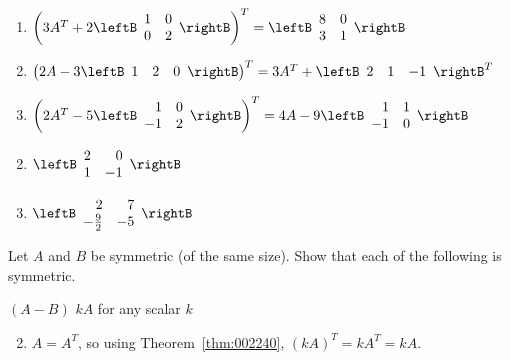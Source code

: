 \begin{multicols}{2}
\begin{ex}
\begin{enumerate}[label={\alph*.}]
\item 
$\left(3A^{T} + 2 \leftB \begin{array}{rr}
1 & 0 \\
0 & 2
\end{array} \rightB \right)^{T} = \leftB \begin{array}{rr}
8 & 0 \\
3 & 1
\end{array} \rightB$

\item 
$\left(2A - 3 \leftB \begin{array}{rrr}
1 & 2 & 0
\end{array} \rightB \right)^{T} = 3A^{T} + \leftB \begin{array}{rrr}
2 & 1 & -1
\end{array} \rightB^{T}$ 

\item 
$\left(2A^{T} - 5 \leftB \begin{array}{rr}
1 & 0 \\
-1 & 2
\end{array} \rightB \right)^{T} = 4A - 9 \leftB \begin{array}{rr}
1 & 1 \\
-1 & 0
\end{array} \rightB$

\end{enumerate}
\begin{sol}
\begin{enumerate}[label={\alph*.}]
\setcounter{enumi}{1}
\item  
$\leftB \begin{array}{rr}
2 & 0 \\
1 & -1
\end{array} \rightB$

\setcounter{enumi}{3}
\item  
$\leftB \begin{array}{rr}
2 & 7 \\
-\frac{9}{2} & -5
\end{array} \rightB$


\end{enumerate}
\end{sol}
\end{ex}

\begin{ex}
Let $A$ and $B$ be symmetric (of the same size). Show that each of the following is symmetric.
\begin{exenumerate}
\exitem $(A - B)$
\exitem $kA$ for any scalar $k$
\end{exenumerate}
\begin{sol}
\begin{enumerate}[label={\alph*.}]
\setcounter{enumi}{1}
\item  $A = A^{T}$, so using Theorem~\ref{thm:002240}, $(kA)^{T} = kA^{T} = kA$.


\end{enumerate}
\end{sol}
\end{ex}
\end{multicols}
